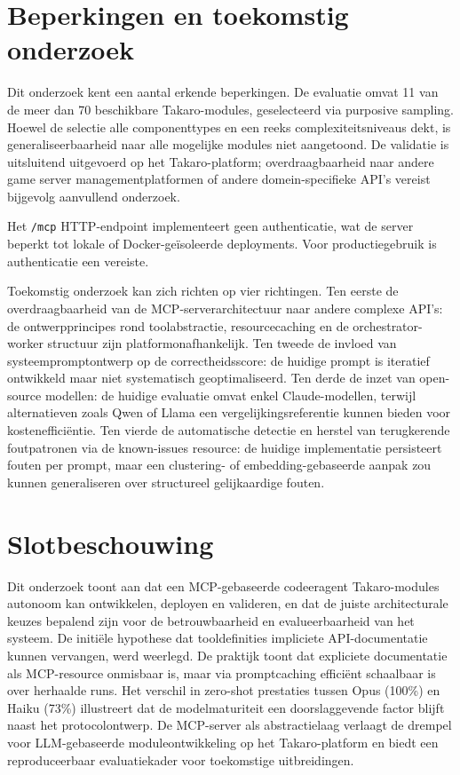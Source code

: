 \section{Beperkingen en toekomstig onderzoek}

Dit onderzoek kent een aantal erkende beperkingen. De evaluatie omvat 11 van de meer dan 70 beschikbare Takaro-modules, geselecteerd via purposive sampling. Hoewel de selectie alle componenttypes en een reeks complexiteitsniveaus dekt, is generaliseerbaarheid naar alle mogelijke modules niet aangetoond. De validatie is uitsluitend uitgevoerd op het Takaro-platform; overdraagbaarheid naar andere game server managementplatformen of andere domein-specifieke API's vereist bijgevolg aanvullend onderzoek.

Het \texttt{/mcp} HTTP-endpoint implementeert geen authenticatie, wat de server beperkt tot lokale of Docker-geïsoleerde deployments. Voor productiegebruik is authenticatie een vereiste.

Toekomstig onderzoek kan zich richten op vier richtingen. Ten eerste de overdraagbaarheid van de MCP-serverarchitectuur naar andere complexe API's: de ontwerpprincipes rond toolabstractie, resourcecaching en de orchestrator-worker structuur zijn platformonafhankelijk. Ten tweede de invloed van systeempromptontwerp op de correctheidsscore: de huidige prompt is iteratief ontwikkeld maar niet systematisch geoptimaliseerd. Ten derde de inzet van open-source modellen: de huidige evaluatie omvat enkel Claude-modellen, terwijl alternatieven zoals Qwen of Llama een vergelijkingsreferentie kunnen bieden voor kostenefficiëntie. Ten vierde de automatische detectie en herstel van terugkerende foutpatronen via de known-issues resource: de huidige implementatie persisteert fouten per prompt, maar een clustering- of embedding-gebaseerde aanpak zou kunnen generaliseren over structureel gelijkaardige fouten.

\section{Slotbeschouwing}

Dit onderzoek toont aan dat een MCP-gebaseerde codeeragent Takaro-modules autonoom kan ontwikkelen, deployen en valideren, en dat de juiste architecturale keuzes bepalend zijn voor de betrouwbaarheid en evalueerbaarheid van het systeem. De initiële hypothese dat tooldefinities impliciete API-documentatie kunnen vervangen, werd weerlegd. De praktijk toont dat expliciete documentatie als MCP-resource onmisbaar is, maar via promptcaching efficiënt schaalbaar is over herhaalde runs. Het verschil in zero-shot prestaties tussen Opus (100\%) en Haiku (73\%) illustreert dat de modelmaturiteit een doorslaggevende factor blijft naast het protocolontwerp. De MCP-server als abstractielaag verlaagt de drempel voor LLM-gebaseerde moduleontwikkeling op het Takaro-platform en biedt een reproduceerbaar evaluatiekader voor toekomstige uitbreidingen.
